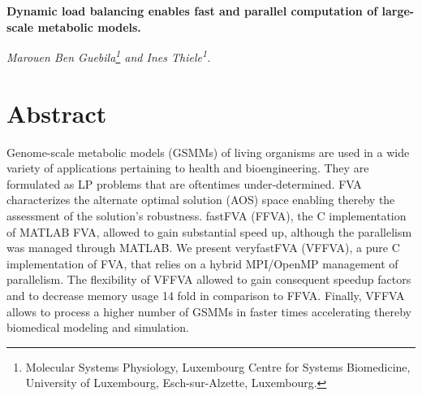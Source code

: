 \noindent \large \textbf{Dynamic load balancing enables fast and parallel computation of large-scale metabolic models.}\\
{ \textit{Marouen Ben Guebila\footnote{Molecular Systems Physiology, Luxembourg Centre for Systems Biomedicine, University of Luxembourg, Esch-sur-Alzette, Luxembourg.} and Ines Thiele\textsuperscript{1}.} \par}%
\section*{Abstract}
{  
Genome-scale metabolic models (GSMMs) of living organisms are used in a wide variety of applications pertaining to health and bioengineering. They are formulated as LP problems that are oftentimes under-determined. FVA characterizes the alternate optimal solution (AOS) space enabling thereby the assessment of the solution's robustness. fastFVA (FFVA), the C implementation of MATLAB FVA, allowed to gain substantial speed up, although the parallelism was managed through MATLAB. We present veryfastFVA (VFFVA), a pure C implementation of FVA, that relies on a hybrid MPI/OpenMP management of parallelism. The flexibility of VFFVA allowed to gain consequent speedup factors and to decrease memory usage 14 fold in comparison to FFVA. Finally, VFFVA allows to process a higher number of GSMMs in faster times accelerating thereby biomedical modeling and simulation.
\par}%

\newpage

